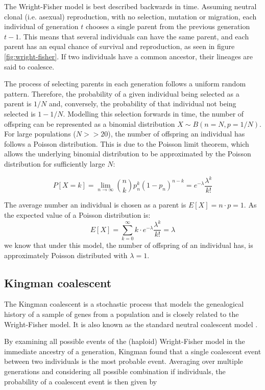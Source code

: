 The Wright-Fisher model is best described backwards in time.
Assuming neutral clonal (i.e. asexual) reproduction, with no selection, mutation or migration, each individual of generation $t$ chooses a single parent from the previous generation $t-1$.
This means that several individuals can have the same parent, and each parent has an equal chance of survival and reproduction, as seen in figure \ref{fig:wright-fisher}.
If two individuals have a common ancestor, their lineages are said to coalesce.

The process of selecting parents in each generation follows a uniform random pattern.
Therefore, the probability of a given individual being selected as a parent is $1/N$ and, conversely, the probability of that individual not being selected is $1-1/N$.
Modelling this selection forwards in time, the number of offspring can be represented as a binomial distribution $X \sim B(n=N, p=1/N)$.
For large populations ($N >> 20$), the number of offspring an individual has follows a Poisson distribution.
This is due to the Poisson limit theorem, which allows the underlying binomial distribution to be approximated by the Poisson distribution for sufficiently large $N$:

\begin{equation}
      P[X=k] = \lim _{n\to \infty }{n \choose k}p_{n}^{k}(1-p_{n})^{n-k}=e^{-\lambda }{\frac {\lambda ^{k}}{k!}}
\end{equation}

The average number an individual is chosen as a parent is $E[X] = n \cdot p = 1$.
As the expected value of a Poisson distribution is:
\begin{equation}
      E[X] = \sum^\infty_{k=0} k \cdot e^{-\lambda }{\frac {\lambda ^{k}}{k!}} = \lambda
\end{equation}
we know that under this model, the number of offspring of an individual has, is approximately Poisson distributed with $\lambda = 1$.

\subsection{Kingman coalescent}\label{subsec:kingman}
The Kingman coalescent is a stochastic process that models the genealogical history of a sample of genes from a population and is closely related to the Wright-Fisher model.
It is also known as the standard neutral coalescent model \cite{Human_Popgen_Lohmueller_2021}.

By examining all possible events of the (haploid) Wright-Fisher model in the immediate ancestry of a generation, Kingman found that a single coalescent event between two individuals is the most probable event.
Averaging over multiple generations and considering all possible combination if individuals, the probability of a coalescent event is then given by

